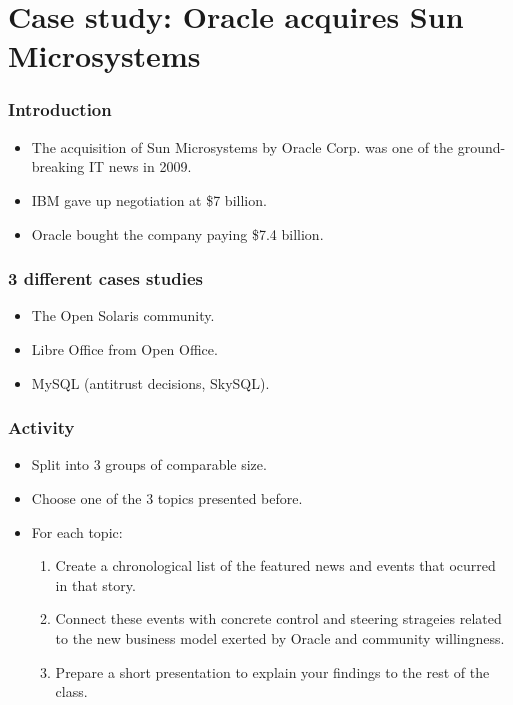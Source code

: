 
\section{Case study: Oracle acquires Sun Microsystems}

\begin{frame}
\frametitle{Introduction}
\begin{itemize}
  \item The acquisition of Sun Microsystems by Oracle Corp. was one of the
ground-breaking IT news in 2009.
  \item IBM gave up negotiation at \$7 billion.
  \item Oracle bought the company paying \$7.4 billion.
  \end{itemize}
\end{frame}


\begin{frame}
\frametitle{3 different cases studies}
\begin{itemize}
  \item The Open Solaris community.
  \item Libre Office from Open Office.
  \item MySQL (antitrust decisions, SkySQL).
\end{itemize}
\end{frame}


\begin{frame}
\frametitle{Activity}
\begin{itemize}
  \item Split into 3 groups of comparable size.
  \item Choose one of the 3 topics presented before.
  \item For each topic:
  \begin{enumerate}
   \item Create a chronological list of the featured news and events that
ocurred in that story.
   \item Connect these events with concrete control and steering strageies related
to the new business model exerted by Oracle and community willingness.
   \item Prepare a short presentation to explain your findings to the rest of the
class.
  \end{enumerate}

  \end{itemize}
\end{frame}


